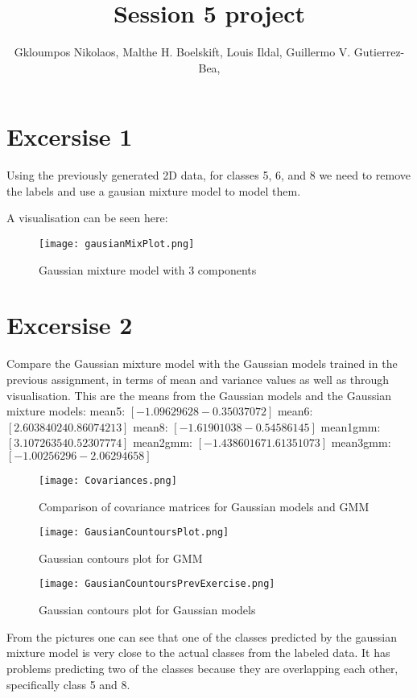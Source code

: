 \documentclass{article}
\title{Session 5 project}
\author {
      Gkloumpos Nikolaos,
      Malthe H. Boelskift,
      Louis Ildal,
      Guillermo V. Gutierrez-Bea,
}
\begin{document}
\maketitle


\section{Excersise 1}
Using the previously generated 2D data, for classes 5, 6, and 8 we need to remove the 
labels and use a gausian mixture model to model them.

A visualisation can be seen here:
\begin{figure}[h]
      \caption{Gaussian mixture model with 3 components}
      \centering
      \texttt{[image: gausianMixPlot.png]}
\end{figure}   

\section{Excersise 2}
Compare the Gaussian mixture model with the Gaussian models trained in the
 previous assignment, in terms of mean and variance values as well as through visualisation.
\newline
This are the means from the Gaussian models and the Gaussian mixture models:
\newline
mean5: $[-1.09629628 -0.35037072]$
\newline
mean6: $[2.60384024 0.86074213]$
\newline
mean8: $[-1.61901038 -0.54586145]$
\newline
mean1gmm: $[3.10726354 0.52307774]$
\newline
mean2gmm: $[-1.43860167  1.61351073]$
\newline
mean3gmm: $[-1.00256296 -2.06294658]$
\newline

\begin{figure}[h]
      \caption{Comparison of covariance matrices for Gaussian models and GMM}
      \centering
      \texttt{[image: Covariances.png]}
\end{figure}     

\begin{figure}[h]
      \caption{Gaussian contours plot for GMM}
      \centering
      \texttt{[image: GausianCountoursPlot.png]}
\end{figure} 

\begin{figure}[h]
      \caption{Gaussian contours plot for Gaussian models}
      \centering
      \texttt{[image: GausianCountoursPrevExercise.png]}
\end{figure} 

From the pictures one can see that one of the classes predicted by the gaussian mixture model is very close to the actual classes from the labeled data. It has problems predicting two of the classes because they are overlapping each other, specifically class 5 and 8. 



\end{document}
